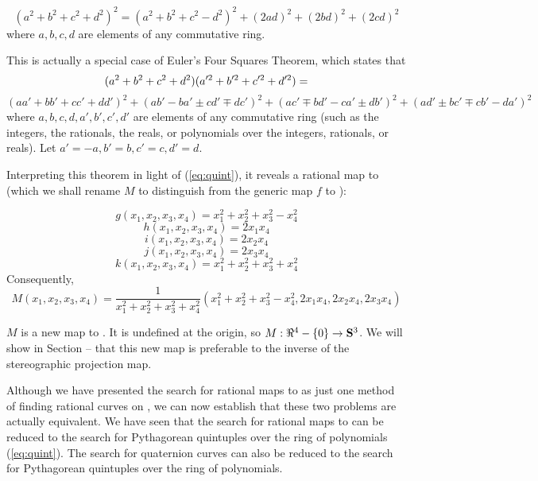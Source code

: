 \begin{theorem}[Euler, 1748]		%

\begin{equation}
\label{eq:euler}
(a^2 + b^2 + c^2 + d^2)^2 = 
(a^2 + b^2 + c^2 - d^2)^2 + (2ad)^2 + (2bd)^2 + (2cd)^2
\end{equation}
where $a,b,c,d$ are elements of any commutative ring.
\end{theorem}
\prf
This is actually a special case of Euler's Four Squares Theorem,
which states that 
\[
(a^2 + b^2 + c^2 + d^2) (a'^2 + b'^2 + c'^2 + d'^2) = \hfill
\]
\[
(aa' + bb' + cc' + dd')^2 +
(ab' - ba' \pm cd' \mp dc')^2 +
(ac' \mp bd' - ca' \pm db')^2 +
(ad' \pm bc' \mp cb' - da')^2
\]
where $a,b,c,d,a',b',c',d'$ are elements of any commutative ring 
(such as the integers, the rationals, the reals, or 
polynomials over the integers, rationals, or reals).
Let $a'=-a, b'=b, c'=c, d'=d$.
\QED

Interpreting this theorem in light of (\ref{eq:quint}),
it reveals a rational map to  (which we shall rename
$M$ to distinguish from the generic map $f$ to ):

\[	g(x_1,x_2,x_3,x_4) = x_1^2 + x_2^2 + x_3^2 - x_4^2	\]
\[	h(x_1,x_2,x_3,x_4) = 2x_1x_4	\]
\[	i(x_1,x_2,x_3,x_4) = 2x_2x_4	\]
\[	j(x_1,x_2,x_3,x_4) = 2x_3x_4	\]
\[	k(x_1,x_2,x_3,x_4) = x_1^2 + x_2^2 + x_3^2 + x_4^2	\]
Consequently,
\begin{equation}
\label{eq:M}
	M(x_1,x_2,x_3,x_4) = \frac{1}{x_1^2 + x_2^2 + x_3^2 + x_4^2}
			     (x_1^2 + x_2^2 + x_3^2 - x_4^2,
			      2x_1x_4, 2x_2x_4, 2x_3x_4)	
\end{equation}

$M$ is a new map to .
It is undefined at the origin, so $M:\Re^4 - \{0\} \rightarrow \mbox{{\bf S}$^{3}$}$.
We will show in Section -- that this new map is
preferable to the inverse of the stereographic projection map.

Although we have presented the search for rational
maps to  as just one method of finding rational
curves on , we can now establish that these two problems 
are actually equivalent.
We have seen that the search for rational maps to  
can be reduced to the search for Pythagorean quintuples over
the ring of polynomials (\ref{eq:quint}).
The search for quaternion curves can also be reduced
to the search for Pythagorean quintuples over the ring
of polynomials.

